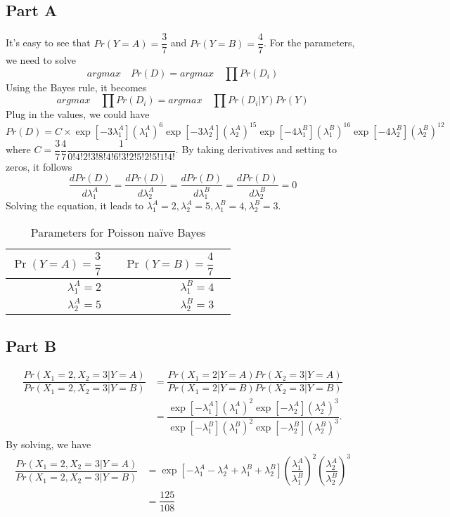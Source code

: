 \subsection{Part A}
It's easy to see that $Pr(Y=A)=\dfrac{3}{7}$ and $Pr(Y=B)=\dfrac{4}{7}$. For the parameters, we need to solve\[ argmax\quad Pr(D)=argmax\quad\prod Pr(D_i)\] Using the Bayes rule, it becomes \[ argmax\quad\prod Pr(D_i)= argmax\quad \prod Pr(D_i|Y)Pr(Y)\] Plug in the values, we could have \[Pr(D)=C\times\exp[-3\lambda_1^A](\lambda_1^A)^6\exp[-3\lambda_2^A](\lambda_2^A)^{15}\exp[-4\lambda_1^B](\lambda_1^B)^{16}\exp[-4\lambda_2^B](\lambda_2^B)^{12}\]
where $C=\dfrac{3}{7}\dfrac{4}{7}\dfrac{1}{0!4!2!3!8!4!6!3!2!5!2!5!1!4!}$. By taking derivatives and setting to zeros, it follows \[\dfrac{dPr(D)}{d\lambda_1^A}=\dfrac{dPr(D)}{d\lambda_2^A}=\dfrac{dPr(D)}{d\lambda_1^B}=\dfrac{dPr(D)}{d\lambda_2^B}=0\]
Solving the equation, it leads to $\lambda_1^A=2,\lambda_2^A=5,\lambda_1^B=4,\lambda_2^B=3$.
\begin{table}[!h]
	\begin{center}
		\begin{tabular}{|rp{1in}|rp{1in}|}
			\hline
			$\Pr(Y=A)=\dfrac{3}{7}$ & & $\Pr(Y=B)=\dfrac{4}{7}$ & \\ \hline
			$\lambda^A_1=2$ & & $\lambda^B_1=4$ & \\ \hline
			$\lambda^A_2=5$ & & $\lambda^B_2=3$ & \\ \hline
		\end{tabular}
		\caption{Parameters for Poisson na\"ive Bayes}
		\label{tab:poissonNBparams}
	\end{center}
\end{table}
\subsection{Part B}

\begin{align*}
\dfrac{Pr(X_1=2,X_2=3|Y=A)}{Pr(X_1=2,X_2=3|Y=B)}
& =\dfrac{Pr(X_1=2|Y=A)Pr(X_2=3|Y=A)}{Pr(X_1=2|Y=B)Pr(X_2=3|Y=B)} \\
&=\dfrac{\exp[-\lambda_1^A](\lambda_1^A)^2\exp[-\lambda_2^A](\lambda_2^A)^3}{\exp[-\lambda_1^B](\lambda_1^B)^2\exp[-\lambda_2^B](\lambda_2^B)^3}.
\end{align*}
By solving, we have
\begin{align*}
 \dfrac{Pr(X_1=2,X_2=3|Y=A)}{Pr(X_1=2,X_2=3|Y=B)}
 &=\exp[-\lambda_1^A-\lambda_2^A+\lambda_1^B+\lambda_2^B](\dfrac{\lambda_1^A}{\lambda_1^B})^2(\dfrac{\lambda_2^A}{\lambda_2^B})^3\\
 & =\dfrac{125}{108}
\end{align*}

